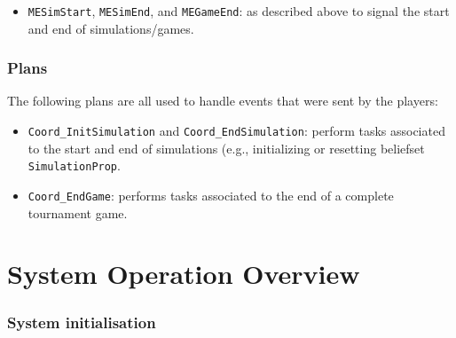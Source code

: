\documentclass[10pt]{article}
\begin{document}
\begin{itemize}

\item \texttt{MESimStart}, \texttt{MESimEnd}, and \texttt{MEGameEnd}: as described above to signal the start and end of simulations/games.

\end{itemize}




\subsubsection*{Plans}

The following plans are all used to handle events that were sent by the players:

\begin{itemize}
\item \texttt{Coord\_InitSimulation} and \texttt{Coord\_EndSimulation}: perform tasks associated to the start and end of simulations (e.g., initializing or resetting beliefset \texttt{SimulationProp}.

\item \texttt{Coord\_EndGame}: performs tasks associated to the end of a complete tournament game.

\end{itemize}













\section{System Operation Overview}


\subsubsection*{System initialisation}
\end{document}
